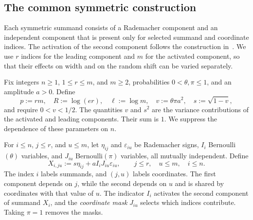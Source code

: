 \documentclass[11pt,letterpaper]{article}
\newenvironment{vSixBlock}{\color{magenta}}{}
\theoremstyle{remark}
\begin{document}
\begin{vSixBlock}
\subsection{The common symmetric construction}
\label{app:lower-family}

Each symmetric summand consists of a Rademacher component and an
independent component that is present only for selected summand and
coordinate indices. The activation of the second component follows
the construction in~\cite[Proposition~E.1]{FKLZ}. We use \(r\)
indices for the leading component and \(m\) for the activated
component, so that their effects on width and on the random shift
can be varied separately.

Fix integers \(n\ge1\), \(1\le r\le m\), and \(m\ge2\),
probabilities \(0<\theta,\pi\le1\), and an amplitude \(a>0\).
Define
\[
 p:=rm,\quad R:=\log(er),\quad \ell:=\log m,\quad
 v:=\theta\pi a^2,\quad s:=\sqrt{1-v},
\]
and require \(0<v<1/2\). The quantities \(v\) and \(s^2\)
are the variance contributions of the activated and leading
components. Their sum is \(1\). We suppress the dependence of
these parameters on \(n\).

For \(i\le n\), \(j\le r\), and \(u\le m\), let
\(\eta_{ij}\) and \(\varepsilon_{iu}\) be Rademacher signs,
\(I_i\) Bernoulli\((\theta)\) variables, and \(J_{iu}\)
Bernoulli\((\pi)\) variables, all mutually independent. Define
\begin{equation}
 X_{i,ju}:=s\eta_{ij}+aI_iJ_{iu}\varepsilon_{iu},
 \qquad j\le r,\quad u\le m,\quad i\le n.
 \label{sym:eq:common-construction}
\end{equation}
The index \(i\) labels summands, and \((j,u)\) labels coordinates.
The first component depends on \(j\), while the second depends on
\(u\) and is shared by coordinates with that value of \(u\).
The indicator \(I_i\) activates the second component of summand
\(X_i\), and the \emph{coordinate mask} \(J_{iu}\) selects
which indices contribute. Taking \(\pi=1\) removes the masks.


\end{vSixBlock}
\end{document}
